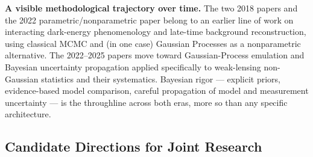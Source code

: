 \documentclass[11pt]{article}
\begin{document}
\textbf{A visible methodological trajectory over time.} The two 2018 papers and the 2022 parametric/nonparametric paper belong to an earlier line of work on interacting dark-energy phenomenology and late-time background reconstruction, using classical MCMC and (in one case) Gaussian Processes as a nonparametric alternative. The 2022--2025 papers move toward Gaussian-Process emulation and Bayesian uncertainty propagation applied specifically to weak-lensing non-Gaussian statistics and their systematics. Bayesian rigor — explicit priors, evidence-based model comparison, careful propagation of model and measurement uncertainty — is the throughline across both eras, more so than any specific architecture.

\subsection{Candidate Directions for Joint Research}
\end{document}
